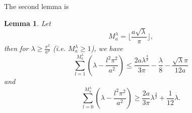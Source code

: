 \documentclass[11pt,letterpaper]{amsart}
\numberwithin{equation}{section}
\theoremstyle{plain}
\newtheorem{lemma}[theorem]{Lemma}
\theoremstyle{plain}
\numberwithin{equation}{section}
\theoremstyle{remark}
\begin{document}
	The second lemma is 
	\begin{lemma}
		Let
		\begin{equation}\label{MNlambda}
			M_a^\lambda= \lfloor{\frac{a\sqrt\lambda}{\pi}}\rfloor, %
		\end{equation}
		then for $\lambda \ge \frac{\pi^2}{a^2}$ (i.e. $M_a^\lambda \ge 1$), we have 
		\begin{equation}\label{summ2}
			\sum_{l=1}^{M_a^\lambda} (\lambda- \frac{l^2\pi^2}{a^2}) \le \frac{2a\lambda^{\frac{3}{2}}}{3\pi}-\frac{\lambda}{8}- \frac{\sqrt \lambda \pi}{12 a}
		\end{equation}
		and
		\begin{equation}\label{summ3}
			\sum_{l=0}^{M_a^\lambda} (\lambda-\frac{l^2\pi^2}{a^2}) \ge \frac{2a}{3\pi}\lambda^{\frac 32}+\frac 1{12}\lambda.
		\end{equation}
	\end{lemma}
\end{document}
